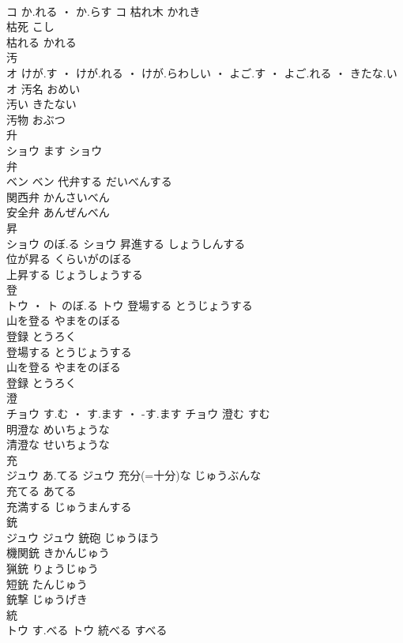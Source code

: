 \documentclass[8pt]{extreport}
\begin{document}
\begin{CJK}{UTF8}{min}
\\	コ	か.れる ・ か.らす	コ	枯れ木	かれき	
\\	枯死	こし	
\\	枯れる	かれる	
\\	汚	
\\	オ	けが.す ・ けが.れる ・ けが.らわしい ・ よご.す ・ よご.れる ・ きたな.い	オ	汚名	おめい	
\\	汚い	きたない	
\\	汚物	おぶつ	
\\	升	
\\	ショウ	ます	ショウ																																			
\\	弁	
\\	ベン		ベン	代弁する	だいべんする	
\\	関西弁	かんさいべん	
\\	安全弁	あんぜんべん	
\\	昇	
\\	ショウ	のぼ.る	ショウ	昇進する	しょうしんする	
\\	位が昇る	くらいがのぼる	
\\	上昇する	じょうしょうする	
\\	登	
\\	トウ ・ ト	のぼ.る	トウ	登場する	とうじょうする	
\\	山を登る	やまをのぼる	
\\	登録	とうろく	
\\	登場する	とうじょうする	
\\	山を登る	やまをのぼる	
\\	登録	とうろく	
\\	澄	
\\	チョウ	す.む ・ す.ます ・ -す.ます	チョウ	澄む	すむ	
\\	明澄な	めいちょうな	
\\	清澄な	せいちょうな	
\\	充	
\\	ジュウ	あ.てる	ジュウ	充分(=十分)な	じゅうぶんな	
\\	充てる	あてる	
\\	充満する	じゅうまんする	
\\	銃	
\\	ジュウ		ジュウ	銃砲	じゅうほう	
\\	機関銃	きかんじゅう	
\\	猟銃	りょうじゅう	
\\	短銃	たんじゅう	
\\	銃撃	じゅうげき	
\\	統	
\\	トウ	す.べる	トウ	統べる	すべる	

\end{CJK}
\end{document}
